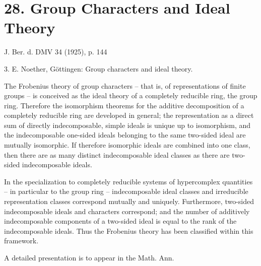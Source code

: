 ﻿\section*{28. Group Characters and Ideal Theory}

\begin{center}
J. Ber. d. DMV 34 (1925), p. 144
\end{center}

3. E. Noether, Göttingen: Group characters and ideal theory.

The Frobenius theory of group characters -- that is, of representations of finite groups -- is conceived as the ideal theory of a completely reducible ring, the group ring. Therefore the isomorphism theorems for the additive decomposition of a completely reducible ring are developed in general; the representation as a direct sum of directly indecomposable, simple ideals is unique up to isomorphism, and the indecomposable one-sided ideals belonging to the same two-sided ideal are mutually isomorphic. If therefore isomorphic ideals are combined into one class, then there are as many distinct indecomposable ideal classes as there are two-sided indecomposable ideals.

In the specialization to completely reducible systems of hypercomplex quantities -- in particular to the group ring -- indecomposable ideal classes and irreducible representation classes correspond mutually and uniquely. Furthermore, two-sided indecomposable ideals and characters correspond; and the number of additively indecomposable components of a two-sided ideal is equal to the rank of the indecomposable ideals. Thus the Frobenius theory has been classified within this framework.

A detailed presentation is to appear in the Math. Ann.

